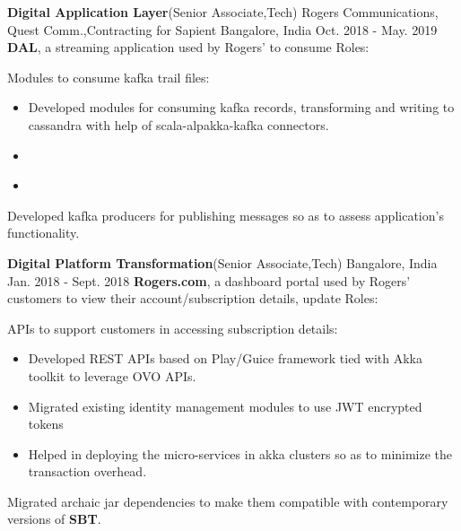 \begin{cventries}
\experienceentry
    {\textbf{Digital Application Layer}(Senior Associate,Tech)}
    {Rogers Communications, Quest Comm.,Contracting for Sapient}
    {Bangalore, India}
    {Oct. 2018 - May. 2019}
    {\textbf{DAL}, a streaming application used by Rogers' to consume  }
    {Roles:}
    {
      \begin{cvitems}
        \item {Modules to consume kafka trail files:}
\begin{itemize}
\item Developed modules for consuming kafka records, transforming and writing to cassandra with help of scala-alpakka-kafka connectors.
\end{itemize}
\begin{itemize}
\item 
\end{itemize}
\begin{itemize}
\item 
\end{itemize}
        \item {Developed kafka producers for publishing messages so as to assess application's functionality.}
             \end{cvitems}
    }
\experienceentry
    {\textbf{Digital Platform Transformation}(Senior Associate,Tech)}
    {}
    {Bangalore, India}
    {Jan. 2018 - Sept. 2018}
    {\textbf{Rogers.com}, a dashboard portal used by Rogers' customers to view their account/subscription details, update  }
    {Roles:}
    {
      \begin{cvitems}
        \item {APIs to support customers in accessing subscription details:}
\begin{itemize}
\item Developed REST APIs based on Play/Guice framework tied with Akka toolkit to leverage OVO APIs.
\end{itemize}
\begin{itemize}
\item Migrated existing identity management modules to use JWT encrypted tokens
\end{itemize}
\begin{itemize}
\item Helped in deploying the micro-services in akka clusters so as to minimize the transaction overhead. 
\end{itemize}
        \item {Migrated archaic jar dependencies to make them compatible with contemporary versions of \textbf{SBT}.}

\end{cvitems}}
\end{cventries}

